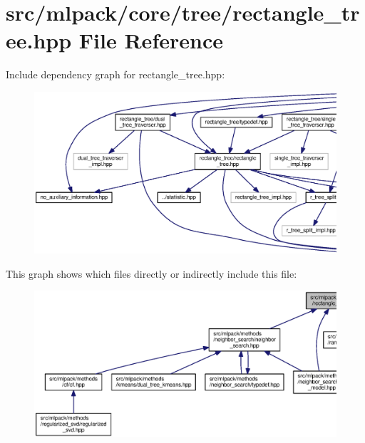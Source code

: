 \section{src/mlpack/core/tree/rectangle\+\_\+tree.hpp File Reference}
\label{rectangle__tree_8hpp}
Include dependency graph for rectangle\+\_\+tree.\+hpp\+:
\nopagebreak
\begin{figure}[H]
\begin{center}
\leavevmode
\includegraphics[width=350pt]{rectangle__tree_8hpp__incl}
\end{center}
\end{figure}
This graph shows which files directly or indirectly include this file\+:
\nopagebreak
\begin{figure}[H]
\begin{center}
\leavevmode
\includegraphics[width=350pt]{rectangle__tree_8hpp__dep__incl}
\end{center}
\end{figure}
